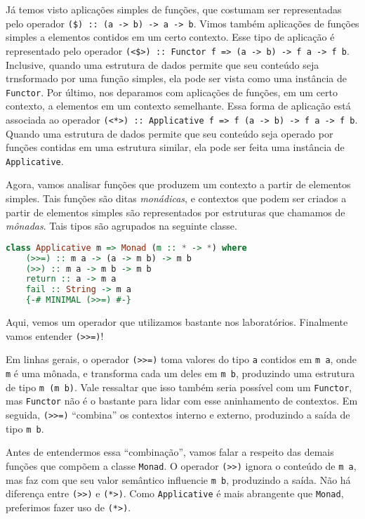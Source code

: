 \documentclass[a4paper]{article}
\begin{document}
Já temos visto aplicações simples de funções, que costumam ser representadas pelo operador \mbox{\texttt{(\$) :: (a -> b) -> a -> b}}.
Vimos também aplicações de funções simples a elementos contidos em um certo contexto.
Esse tipo de aplicação é representado pelo operador \mbox{\texttt{(<\$>) :: Functor f => (a -> b) -> f a -> f b}}.
Inclusive, quando uma estrutura de dados permite que seu conteúdo seja trnsformado por uma função simples, ela pode ser vista como uma instância de \texttt{Functor}.
Por último, nos deparamos com aplicações de funções, em um certo contexto, a elementos em um contexto semelhante.
Essa forma de aplicação está associada ao operador \mbox{\texttt{(<*>) :: Applicative f => f (a -> b) -> f a -> f b}}.
Quando uma estrutura de dados permite que seu conteúdo seja operado por funções contidas em uma estrutura similar, ela pode ser feita uma instância de \texttt{Applicative}.

Agora, vamos analisar funções que produzem um contexto a partir de elementos simples.
Tais funções são ditas \emph{monádicas}, e contextos que podem ser criados a partir de elementos simples são representados por estruturas que chamamos de \emph{mônadas}.
Tais tipos são agrupados na seguinte classe.

\begin{lstlisting}[language=haskell, frame=single]
class Applicative m => Monad (m :: * -> *) where
	(>>=) :: m a -> (a -> m b) -> m b
	(>>) :: m a -> m b -> m b
	return :: a -> m a
	fail :: String -> m a
	{-# MINIMAL (>>=) #-}
\end{lstlisting}

Aqui, vemos um operador que utilizamos bastante nos laboratórios.
Finalmente vamos entender \texttt{(>>=)}!

Em linhas gerais, o operador \texttt{(>>=)} toma valores do tipo \texttt{a} contidos em \texttt{m a}, onde \texttt{m} é uma mônada, e transforma cada um deles em \texttt{m b}, produzindo uma estrutura de tipo \texttt{m (m b)}.
Vale ressaltar que isso também seria possível com um \texttt{Functor}, mas \texttt{Functor} não é o bastante para lidar com esse aninhamento de contextos.
Em seguida, \texttt{(>>=)} ``combina'' os contextos interno e externo, produzindo a saída de tipo \texttt{m b}.

Antes de entendermos essa ``combinação'', vamos falar a respeito das demais funções que compõem a classe \texttt{Monad}.
O operador \texttt{(>>)} ignora o conteúdo de \texttt{m a}, mas faz com que seu valor semântico influencie \texttt{m b}, produzindo a saída.
Não há diferença entre \texttt{(>>)} e \texttt{(*>)}.
Como \texttt{Applicative} é mais abrangente que \texttt{Monad}, preferimos fazer uso de \texttt{(*>)}.
\end{document}

